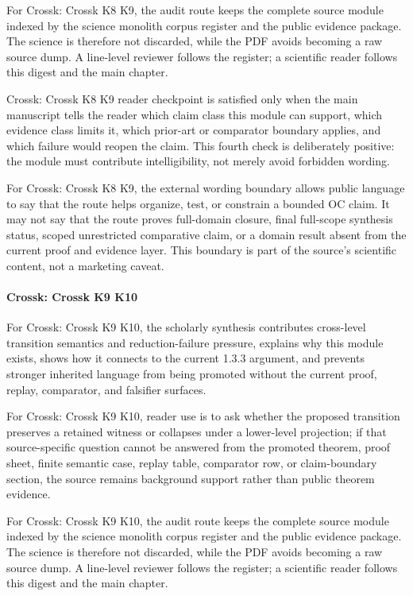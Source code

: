 For Crossk: Crossk K8 K9, the audit route keeps the complete source module indexed by the science monolith corpus register and the public evidence package. The science is therefore not discarded, while the PDF avoids becoming a raw source dump. A line-level reviewer follows the register; a scientific reader follows this digest and the main chapter.


Crossk: Crossk K8 K9 reader checkpoint is satisfied only when the main manuscript tells the reader which claim class this module can support, which evidence class limits it, which prior-art or comparator boundary applies, and which failure would reopen the claim. This fourth check is deliberately positive: the module must contribute intelligibility, not merely avoid forbidden wording.


For Crossk: Crossk K8 K9, the external wording boundary allows public language to say that the route helps organize, test, or constrain a bounded OC claim. It may not say that the route proves full-domain closure, final full-scope synthesis status, scoped unrestricted comparative claim, or a domain result absent from the current proof and evidence layer. This boundary is part of the source's scientific content, not a marketing caveat.


\paragraph{Crossk: Crossk K9 K10}

For Crossk: Crossk K9 K10, the scholarly synthesis contributes cross-level transition semantics and reduction-failure pressure, explains why this module exists, shows how it connects to the current 1.3.3 argument, and prevents stronger inherited language from being promoted without the current proof, replay, comparator, and falsifier surfaces.


For Crossk: Crossk K9 K10, reader use is to ask whether the proposed transition preserves a retained witness or collapses under a lower-level projection; if that source-specific question cannot be answered from the promoted theorem, proof sheet, finite semantic case, replay table, comparator row, or claim-boundary section, the source remains background support rather than public theorem evidence.


For Crossk: Crossk K9 K10, the audit route keeps the complete source module indexed by the science monolith corpus register and the public evidence package. The science is therefore not discarded, while the PDF avoids becoming a raw source dump. A line-level reviewer follows the register; a scientific reader follows this digest and the main chapter.



